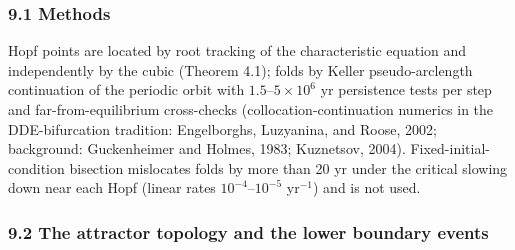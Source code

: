 \documentclass[11pt]{article}
\begin{document}
\subsubsection{9.1 Methods}\label{methods}

Hopf points are located by root tracking of the characteristic equation
and independently by the cubic (Theorem 4.1); folds by Keller
pseudo-arclength continuation of the periodic orbit with
\(1.5\)--\(5\times10^6\) yr persistence tests per step and
far-from-equilibrium cross-checks (collocation-continuation numerics in
the DDE-bifurcation tradition: Engelborghs, Luzyanina, and Roose, 2002;
background: Guckenheimer and Holmes, 1983; Kuznetsov, 2004).
Fixed-initial-condition bisection mislocates folds by more than 20 yr
under the critical slowing down near each Hopf (linear rates
\(10^{-4}\)--\(10^{-5}\) yr\(^{-1}\)) and is not used.

\subsubsection{9.2 The attractor topology and the lower boundary
events}\label{the-attractor-topology-and-the-lower-boundary-events}
\end{document}
